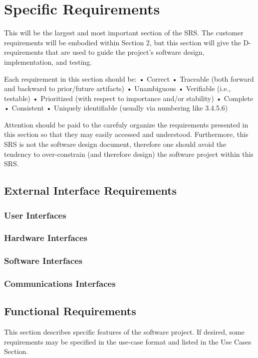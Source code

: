 \documentclass{scrreprt}
\begin{document}
\chapter{Specific Requirements}

This will be the largest and most important section of the SRS.  The customer requirements will be embodied within Section 2, but this section will give the D-requirements that are used to guide the project’s software design, implementation, and testing.

Each requirement in this section should be:
•  Correct
•  Traceable (both forward and backward to prior/future artifacts)
•  Unambiguous
•  Verifiable (i.e., testable)
•  Prioritized (with respect to importance and/or stability)
•  Complete
•  Consistent
•  Uniquely identifiable (usually via numbering like 3.4.5.6)

Attention should be paid to the carefuly organize the requirements presented in this section so that they may easily accessed and understood.  Furthermore, this SRS is not the software design document, therefore one should avoid the tendency to over-constrain (and therefore design) the software project within this SRS.

  \section{External Interface Requirements}

    \subsection{User Interfaces}

    \subsection{Hardware Interfaces}

    \subsection{Software Interfaces}

    \subsection{Communications Interfaces}

  \section{Functional Requirements}
This section describes specific features of the software project.  If desired, some requirements may be specified in the use-case format and listed in the Use Cases Section.
\end{document}
